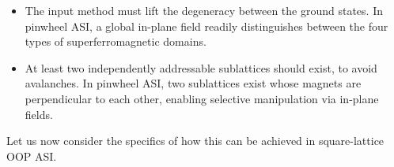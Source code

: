 \begin{itemize}
	\item The input method must lift the degeneracy between the ground states. \newline
	In pinwheel ASI, a global in-plane field readily distinguishes between the four types of superferromagnetic domains.
	\item At least two independently addressable sublattices should exist, to avoid avalanches. \newline
	In pinwheel ASI, two sublattices exist whose magnets are perpendicular to each other, enabling selective manipulation via in-plane fields.
\end{itemize}
Let us now consider the specifics of how this can be achieved in square-lattice OOP ASI.

